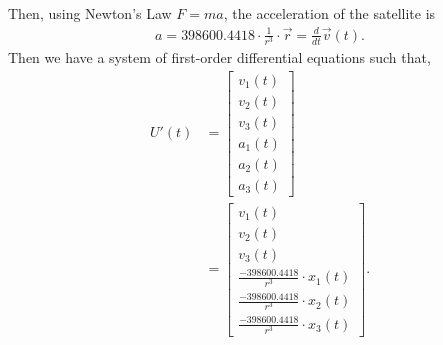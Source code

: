 \documentclass[12pt]{scrartcl}
\begin{document}
Then, using Newton's Law \(F=ma\), the acceleration of the satellite is
\begin{align}
a = 398600.4418 \cdot \frac{1}{r^3} \cdot \vec{r}=\frac{d}{dt} \vec{v}(t).
\end{align}
Then we have a system of first-order differential equations such that,
\begin{align}
U'(t) 
&= \left[\begin{array}{c} 
v_1(t) \\
v_2(t) \\
v_3(t) \\
a_1(t) \\
a_2(t) \\
a_3(t)
\end{array} \right] \\
&= \left[\begin{array}{c} 
v_1(t) \\
v_2(t) \\
v_3(t) \\
\frac{-398600.4418}{r^3} \cdot x_1(t) \\
\frac{-398600.4418}{r^3} \cdot x_2(t) \\
\frac{-398600.4418}{r^3} \cdot x_3(t) 
\end{array} \right].
\end{align}
\end{document}
